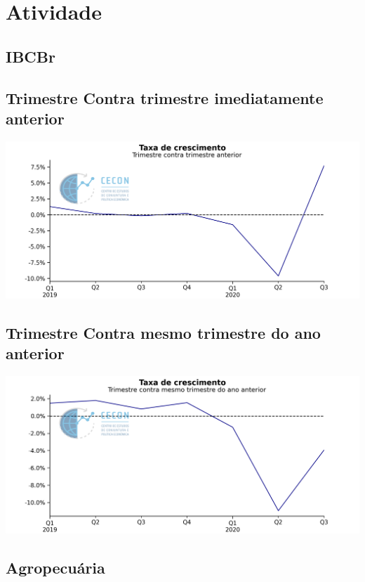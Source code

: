 \documentclass{SelfArx}
\begin{document}
\section*{Atividade}
\label{sec:org4f8bc02}

\subsection*{IBCBr}
\label{sec:orgd59f1de}

\subsection*{Trimestre Contra trimestre imediatamente anterior}
\label{sec:org1701ebf}

\begin{center}
\includegraphics[width=.9\linewidth]{./figs/PIB/PIB.png}
\end{center}

\subsection*{Trimestre Contra mesmo trimestre do ano anterior}
\label{sec:org3652e6f}

\begin{center}
\includegraphics[width=.9\linewidth]{./figs/PIB/PIB_YoY.png}
\end{center}

\subsection*{Agropecuária}
\label{sec:org0f359f1}
\end{document}

